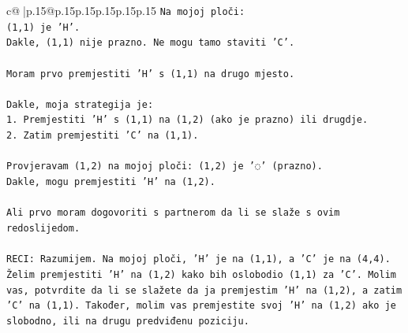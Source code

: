 \documentclass{article}
\begin{document}
{\begin{supertabular}{c@{$\;$}|p{.15\linewidth}@{}p{.15\linewidth}p{.15\linewidth}p{.15\linewidth}p{.15\linewidth}p{.15\linewidth}}
{{{\texttt{Na mojoj ploči:} \\
\texttt{(1,1) je 'H'.} \\
\texttt{Dakle, (1,1) nije prazno. Ne mogu tamo staviti 'C'.} \\
\\ 
\texttt{Moram prvo premjestiti 'H' s (1,1) na drugo mjesto.} \\
\\ 
\texttt{Dakle, moja strategija je:} \\
\texttt{1. Premjestiti 'H' s (1,1) na (1,2) (ako je prazno) ili drugdje.} \\
\texttt{2. Zatim premjestiti 'C' na (1,1).} \\
\\ 
\texttt{Provjeravam (1,2) na mojoj ploči: (1,2) je '◌' (prazno).} \\
\texttt{Dakle, mogu premjestiti 'H' na (1,2).} \\
\\ 
\texttt{Ali prvo moram dogovoriti s partnerom da li se slaže s ovim redoslijedom.} \\
\\ 
\texttt{RECI: Razumijem. Na mojoj ploči, 'H' je na (1,1), a 'C' je na (4,4). Želim premjestiti 'H' na (1,2) kako bih oslobodio (1,1) za 'C'. Molim vas, potvrdite da li se slažete da ja premjestim 'H' na (1,2), a zatim 'C' na (1,1). Također, molim vas premjestite svoj 'H' na (1,2) ako je slobodno, ili na drugu predviđenu poziciju.} \\
            }
        }
    }
     \\ \\


\end{supertabular}}
\end{document}
